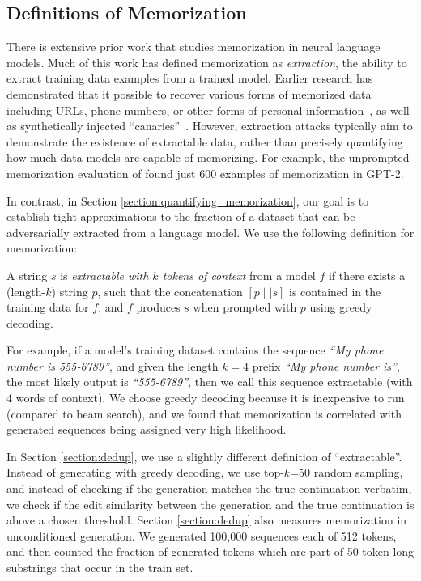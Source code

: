 \subsection{Definitions of Memorization}
\label{sec:mem-def}

There is extensive prior work that studies memorization in neural language models.
Much of this work has defined memorization as \emph{extraction}, the ability to extract training data examples from a trained model.
Earlier research has demonstrated that it possible to recover various forms of memorized data including URLs, phone numbers, or other forms of personal information~\citep{carlini2020extracting, ziegler2021copilot}, as well as synthetically injected ``canaries''~\citep{carlini2019secret, henderson2017ethical, thakkar2020understanding, thomas2020investigating}.
%
However, extraction attacks typically aim to demonstrate the existence of extractable data, rather than precisely quantifying how much data models are capable of memorizing.
For example, the unprompted memorization evaluation of \citet{carlini2020extracting} found just 600 examples of memorization in GPT-2.

In contrast, in Section \ref{section:quantifying_memorization}, our goal is to establish tight approximations to the fraction of a dataset that can be adversarially extracted from a language model.
We use the following definition for memorization:

%
\begin{definition}
A string $s$ is \emph{extractable with $k$ tokens of context} from a model $f$ if there exists a (length-$k$) string $p$, such that the concatenation $[p \mid \mid s]$ is contained in the training data for $f$, and $f$ produces $s$ when prompted with $p$ using greedy decoding.
\label{def:extractable}
\end{definition}

For example, if a model's training dataset contains the sequence \textit{``My phone number is 555-6789''},
and given the length $k=4$ prefix \textit{``My phone number is''}, the most likely output is \textit{``555-6789''}, then we call this sequence extractable (with 4 words of context).
We choose greedy decoding because it is inexpensive to run (compared to beam search), and we found that memorization is correlated with generated sequences being assigned very high likelihood.

In Section \ref{section:dedup}, we use a slightly different definition of ``extractable''.
Instead of generating with greedy decoding, we use top-$k$=50 random sampling, and instead of checking if the generation  matches the true continuation verbatim, we check if the edit similarity between the generation and the true continuation is above a chosen threshold.
Section \ref{section:dedup} also measures memorization in unconditioned generation.
We generated 100,000 sequences each of 512 tokens, and then counted the fraction of generated tokens which are part of 50-token long substrings that occur in the train set. 

